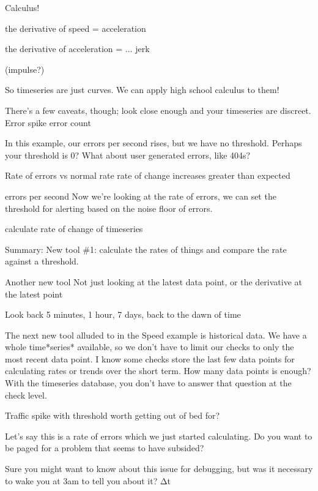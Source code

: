 \documentclass[online,12pt,helvetica]{chaksem}
\begin{document}
\begin{slide}

Calculus!

the derivative of speed = acceleration

the derivative of acceleration = ... jerk

(impulse?)
\end{slide}


So timeseries are just curves.  We can apply high school calculus to them!

There's a few caveats, though; look close enough and your timeseries are discreet.
Error spike
error count

In this example, our errors per second rises, but we have no threshold.  Perhaps your threshold is 0?  What about user generated errors, like 404s?

Rate of errors vs normal rate
rate of change increases greater than expected

errors per second
Now we're looking at the rate of errors, we can set the threshold for alerting based on the noise floor of errors.

calculate rate of change of timeseries
\begin{slide}
Summary: New tool {\#}1: calculate the rates of things and compare the rate
against a threshold.
\end{slide}

Another new tool
Not just looking at the latest data point, or the derivative at the latest point

Look back 5 minutes, 1 hour, 7 days, back to the dawn of time



The next new tool alluded to in the Speed example is historical data.  We have a whole time*series* available, so we don't have to limit our checks to only the most recent data point.  I know some checks store the last few data points for calculating rates or trends over the short term.  How many data points is enough?  With the timeseries database, you don't have to answer that question at the check level.

Traffic spike with threshold
worth getting out of bed for?

Let's say this is a rate of errors which we just started calculating.  Do you want to be paged for a problem that seems to have subsided?

Sure you might want to know about this issue for debugging, but was it necessary to wake you at 3am to tell you about it?
Δt
\end{document}
